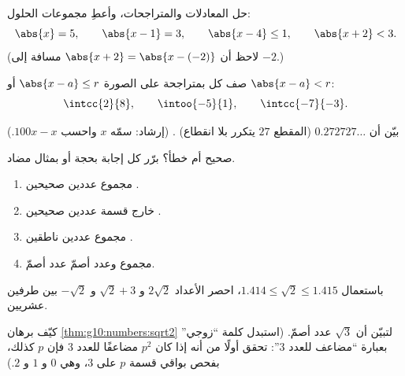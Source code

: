 \begin{exercise}[$\star$]\label{exo:g10:numbers:5}
حل المعادلات والمتراجحات، وأعطِ مجموعات الحلول:
\[
\abs{x} = 5, \qquad \abs{x - 1} = 3, \qquad \abs{x - 4} \leq 1, \qquad
\abs{x + 2} < 3 .
\]
(لاحظ أن $\abs{x+2} = \abs{x - (-2)}$ مسافة إلى $-2$.)
\end{exercise}

\begin{exercise}[$\star\star$]\label{exo:g10:numbers:6}
صف كل  بمتراجحة على الصورة
$\abs{x - a} \leq r$ أو $\abs{x - a} < r$:
\[
\intcc{2}{8}, \qquad \intoo{-5}{1}, \qquad \intcc{-7}{-3}.
\]
\end{exercise}

\begin{exercise}[$\star\star$]\label{exo:g10:numbers:7}
بيّن أن $0.272727\dots$ (المقطع $27$ يتكرر بلا انقطاع) .
(إرشاد: سمّه $x$ واحسب $100x - x$.)
\end{exercise}

\begin{exercise}[$\star\star$]\label{exo:g10:numbers:8}
صحيح أم خطأ؟ برّر كل إجابة بحجة أو بمثال مضاد.
\begin{enumerate}
  \item مجموع عددين صحيحين .
  \item خارج قسمة عددين صحيحين .
  \item مجموع عددين ناطقين .
  \item مجموع  وعدد أصمّ عدد
        أصمّ.
\end{enumerate}
\end{exercise}

\begin{exercise}[$\star\star$]\label{exo:g10:numbers:9}
باستعمال $1.414 \leq \sqrt 2 \leq 1.415$، احصر الأعداد $2\sqrt2$ و
$\sqrt2 + 3$ و $-\sqrt2$ بين طرفين عشريين.
\end{exercise}

\begin{exercise}[$\star\star\star$]\label{exo:g10:numbers:10}
كيّف برهان \cref{thm:g10:numbers:sqrt2} لتبيّن أن $\sqrt 3$ عدد
أصمّ. (استبدل كلمة ``زوجي'' بعبارة ``مضاعف للعدد $3$'': تحقق أولًا من أنه إذا
كان $p^2$ مضاعفًا للعدد $3$ فإن $p$ كذلك، بفحص بواقي قسمة $p$ على
$3$، وهي $0$ و $1$ و $2$.)
\end{exercise}

